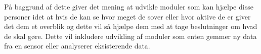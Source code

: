 På baggrund af dette giver det mening at udvikle moduler som kan hjælpe disse personer idet at hvis de kan se hvor meget de sover eller hvor aktive de er giver det dem et overblik og dette vil så hjælpe dem med at tage beslutninger om hvad de skal gøre. 
Dette vil inkludere udvikling af moduler som enten gemmer ny data fra en sensor eller analyserer eksisterende data.